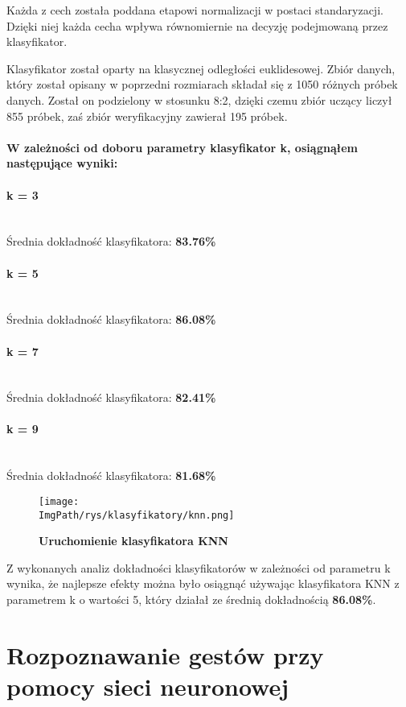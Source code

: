 \documentclass[a4paper,12pt,twoside,openany]{report}
\newcommand{\ImgPath}{.}
\begin{document}
Każda z cech została poddana etapowi normalizacji w postaci standaryzacji. Dzięki niej każda cecha wpływa równomiernie na decyzję podejmowaną przez klasyfikator.

Klasyfikator został oparty na klasycznej odległości euklidesowej. Zbiór danych, który został opisany w poprzedni rozmiarach składał się z 1050 różnych próbek danych. Został on podzielony w stosunku 8:2, dzięki czemu zbiór uczący liczył 855 próbek, zaś zbiór weryfikacyjny zawierał 195 próbek. 

\paragraph{W zależności od doboru parametry klasyfikator k, osiągnąłem następujące wyniki:}
{\centering
\paragraph{k = 3}
	\mbox{}\\
	Średnia dokładność klasyfikatora: \textbf{83.76\%}
\paragraph{k = 5}
	\mbox{}\\
	Średnia dokładność klasyfikatora: \textbf{86.08\%}
\paragraph{k = 7}
	\mbox{}\\
	Średnia dokładność klasyfikatora: \textbf{82.41\%}
\paragraph{k = 9}
	\mbox{}\\
	Średnia dokładność klasyfikatora: \textbf{81.68\%} \par
}
	\begin{figure}[H]
		\centering
		{\label{fig:b}\texttt{[image: \\ImgPath/rys/klasyfikatory/knn.png]}}
		\caption{  \textbf{Uruchomienie klasyfikatora KNN}}
	\end{figure}
	
Z wykonanych analiz dokładności klasyfikatorów w zależności od parametru k wynika, że najlepsze efekty można było osiągnąć używając klasyfikatora KNN z parametrem k o wartości 5, który działał ze średnią dokładnością \textbf{86.08\%}.
\section{Rozpoznawanie gestów przy pomocy sieci neuronowej}
\end{document}
